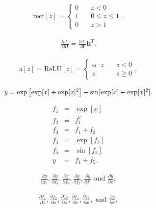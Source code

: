 \documentclass[letterpaper,twoside,openany, titlepage,oldfontcommands,titles,dvipsnames]{memoir}
\begin{document}
\begin{eqnarray}
 \mbox{rect}[z] = \begin{cases} 0 & \quad z < 0 \\ 1 & \quad 0 \leq z\leq 1 \\ 0 & \quad z > 1\end{cases}.
 \end{eqnarray}

\begin{eqnarray}
     \frac{\partial \ell}{\partial \boldsymbol\Omega} = \frac{\partial \ell}{\partial \mathbf{f}}\mathbf{h}^{T}.
 \end{eqnarray}

\begin{eqnarray}\label{eq:train2_prob_leaky_relu}
 \mbox{a}[z] = \mbox{ReLU}[z] = \begin{cases} \alpha \cdot z & \quad z <0 \\ z & \quad z\geq 0\end{cases},
 \end{eqnarray}

\begin{eqnarray}\label{eq:prob_comp_graph}\index{reverse-mode differentiation}\index{differentiation!reverse mode}\index{backpropagation!on acyclic graph}
  y = \exp\left[\exp[x]+\exp[x]^2\right]+ \sin[\exp[x]+\exp[x]^2].
 \end{eqnarray}

\begin{eqnarray}
 f_{1} &=& \exp[x]\nonumber \\
 f_{2} &=& f_{1}^2\nonumber \\
 f_{3} &=& f_{1}+f_{2}\nonumber \\
 f_{4} &=& \exp[f_{3}]\nonumber \\
 f_{5} &=& \sin[f_{3}]\nonumber \\
 y &=& f_{4}+f_{5}.
 \end{eqnarray}

\begin{eqnarray}
  \frac{\partial y}{\partial f_{5}}, \frac{\partial y}{\partial f_{4}}, \frac{\partial y}{\partial f_{3}},
  \frac{\partial y}{\partial f_{2}}, \frac{\partial y}{\partial f_{1}} \mbox{ and } \frac{\partial y}{\partial x},
 \end{eqnarray}

\begin{eqnarray}
  \frac{\partial f_{1}}{\partial x}, \frac{\partial f_{2}}{\partial x}, \frac{\partial f_{3}}{\partial x}, \frac{\partial f_4}{\partial x},
  \frac{\partial f_{5}}{\partial x}, \mbox{ and } \frac{\partial y}{\partial x},
 \end{eqnarray}
\end{document}
